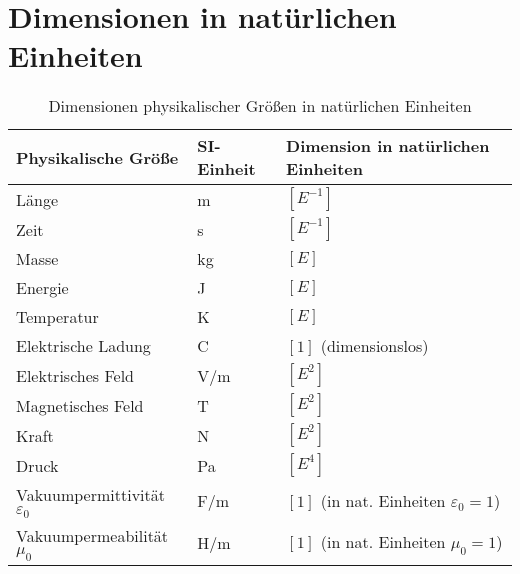 \documentclass[12pt,a4paper]{article}
\begin{document}
	\section{Dimensionen in natürlichen Einheiten}
	
	\begin{table}[h]
		\centering
		\begin{tabular}{lll}
			\toprule
			\textbf{Physikalische Größe} & \textbf{SI-Einheit} & \textbf{Dimension in natürlichen Einheiten} \\
			\midrule
			Länge & m & $[E^{-1}]$ \\
			Zeit & s & $[E^{-1}]$ \\
			Masse & kg & $[E]$ \\
			Energie & J & $[E]$ \\
			Temperatur & K & $[E]$ \\
			Elektrische Ladung & C & $[1]$ (dimensionslos) \\
			Elektrisches Feld & V/m & $[E^2]$ \\
			Magnetisches Feld & T & $[E^2]$ \\
			Kraft & N & $[E^2]$ \\
			Druck & Pa & $[E^4]$ \\
			Vakuumpermittivität $\varepsilon_0$ & F/m & $[1]$ (in nat. Einheiten $\varepsilon_0 = 1$) \\
			Vakuumpermeabilität $\mu_0$ & H/m & $[1]$ (in nat. Einheiten $\mu_0 = 1$) \\
			\bottomrule
		\end{tabular}
		\caption{Dimensionen physikalischer Größen in natürlichen Einheiten}
	\end{table}
	
\end{document}
